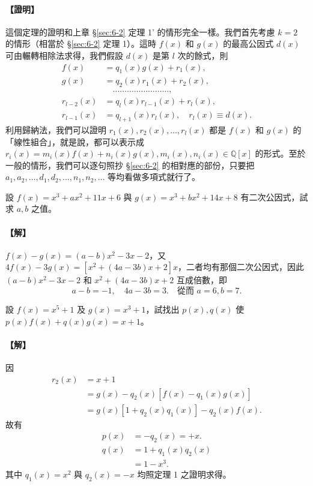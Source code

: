 \paragraph{【證明】}
這個定理的證明和上章 \S\ref{sec:6-2} 定理 1' 的情形完全一樣。我們首先考慮 $k=2$ 的情形（相當於 \S\ref{sec:6-2} 定理 1）。這時 $f(x)$ 和 $g(x)$ 的最高公因式 $d(x)$ 可由輾轉相除法求得，我們假設 $d(x)$ 是第 $l$ 次的餘式，則
\begin{align*}
  f(x) &= q_1(x) g(x) + r_1(x), \\
  g(x) &= q_2(x) r_1(x) + r_2(x), \\
  &\quad \dots\dots\dots\dots\dots\dots\dots\dots, \\
  r_{l-2}(x) &= q_l(x) r_{l-1}(x) + r_l(x), \\
  r_{l-1}(x) &= q_{l+1}(x) r_l(x), \quad r_l(x) \equiv d(x).
\end{align*}
利用歸納法，我們可以證明 $r_1(x), r_2(x), \dots, r_l(x)$ 都是 $f(x)$ 和 $g(x)$ 的「線性組合」，就是說，都可以表示成 $r_i(x) = m_i(x) f(x) + n_i(x) g(x), m_i(x), n_i(x) \in \mathbb{Q}[x]$ 的形式。至於一般的情形，我們可以逐句照抄 \S\ref{sec:6-2} 的相對應的部份，只要把 $a_1, a_2, \dots, d_1, d_2, \dots, n_1, n_2, \dots$ 等均看做多項式就行了。

\begin{example}\label{ex:7-1-4}
設 $f(x) = x^3+ax^2+11x+6$ 與 $g(x) = x^3+bx^2+14x+8$ 有二次公因式，試求 $a, b$ 之值。

\paragraph{【解】}
$f(x)-g(x) = (a-b)x^2-3x-2$，又 $4f(x)-3g(x) = [x^2+(4a-3b)x+2]x$，二者均有那個二次公因式，因此 $(a-b)x^2-3x-2$ 和 $x^2+(4a-3b)x+2$ 互成倍數，即
\begin{equation*}
  a-b = -1, \quad 4a-3b = 3. \quad \text{從而 } a=6, b=7.
\end{equation*}
\end{example}

\begin{example}\label{ex:7-1-5}
設 $f(x) = x^5+1$ 及 $g(x) = x^3+1$，試找出 $p(x), q(x)$ 使 $p(x)f(x)+q(x)g(x) = x+1$。

\paragraph{【解】}
因
\begin{align*}
  r_2(x) &= x+1 \\
  &= g(x) - q_2(x)[f(x) - q_1(x)g(x)] \\
  &= g(x)[1+q_2(x)q_1(x)] - q_2(x)f(x).
\end{align*}
故有
\begin{align*}
  p(x) &= -q_2(x) = +x. \\
  q(x) &= 1+q_1(x)q_2(x) \\
  &= 1-x^3.
\end{align*}
其中 $q_1(x) = x^2$ 與 $q_2(x) = -x$ 均照定理 1 之證明求得。
\end{example}

